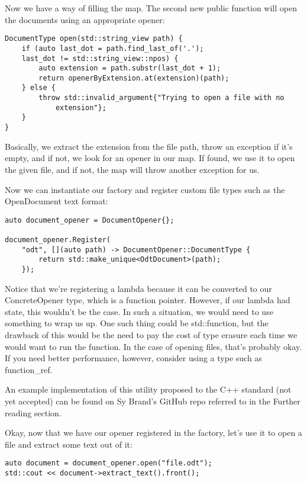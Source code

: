 Now we have a way of filling the map. The second new public function will open the documents using an appropriate opener:

\begin{lstlisting}[style=styleCXX]
DocumentType open(std::string_view path) {
	if (auto last_dot = path.find_last_of('.');
	last_dot != std::string_view::npos) {
		auto extension = path.substr(last_dot + 1);
		return openerByExtension.at(extension)(path);
	} else {
		throw std::invalid_argument{"Trying to open a file with no
			extension"};
	}
}
\end{lstlisting}

Basically, we extract the extension from the file path, throw an exception if it's empty, and if not, we look for an opener in our map. If found, we use it to open the given file, and if not, the map will throw another exception for us.

Now we can instantiate our factory and register custom file types such as the OpenDocument text format:

\begin{lstlisting}[style=styleCXX]
auto document_opener = DocumentOpener{};

document_opener.Register(
	"odt", [](auto path) -> DocumentOpener::DocumentType {
		return std::make_unique<OdtDocument>(path);
	});
\end{lstlisting}

Notice that we're registering a lambda because it can be converted to our ConcreteOpener type, which is a function pointer. However, if our lambda had state, this wouldn't be the case. In such a situation, we would need to use something to wrap us up. One such thing could be std::function, but the drawback of this would be the need to pay the cost of type erasure each time we would want to run the function. In the case of opening files, that's probably okay. If you need better performance, however, consider using a type such as function\_ref.

An example implementation of this utility proposed to the C++ standard (not yet accepted) can be found on Sy Brand's GitHub repo referred to in the Further reading section.

Okay, now that we have our opener registered in the factory, let's use it to open a file and extract some text out of it:

\begin{lstlisting}[style=styleCXX]
auto document = document_opener.open("file.odt");
std::cout << document->extract_text().front();
\end{lstlisting}

